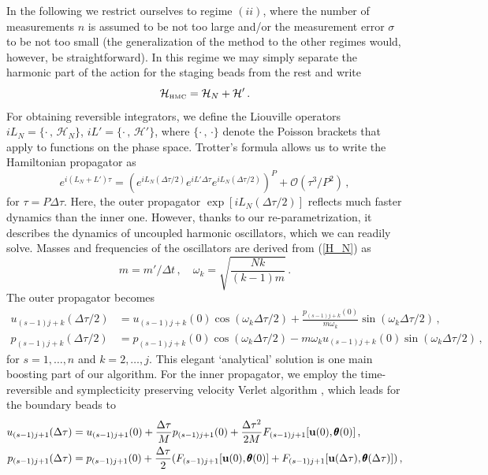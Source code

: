 \documentclass[11pt]{article}
\newcommand{\vc}[1]{{\bf #1 }}
\theoremstyle{definition}
\begin{document}
In the following we restrict ourselves to regime $(ii)$, where the number of measurements $n$ is assumed to be not too large and/or the measurement error $\sigma$ to be not too small (the generalization of the method to the other regimes would, however, be straightforward). In this regime we may simply separate the harmonic part of the action for the staging beads from the rest and write
\begin{equation}
  \mathcal{H}_{\mbox{\tiny HMC}}=\mathcal H_N + \mathcal H'\,.
\end{equation}
For obtaining reversible integrators, we define the Liouville operators
$ iL_N=\{\cdot\,,\,\mathcal H_N\}$, $iL'=\{\cdot\,,\,\mathcal H'\}$,
where $\{\cdot\,,\,\cdot\}$ denote the Poisson brackets that apply to functions on the phase space.
Trotter's formula \cite{trotter_1959} allows us to write the Hamiltonian propagator as
\begin{equation}\label{propagator}
  e^{i(L_N+L')\tau}
  =
  (e^{iL_N(\Delta\tau/2)}e^{iL'\Delta\tau}e^{iL_N(\Delta\tau/2)})^P
  +
  \mathcal O(\tau^3/P^{2})\,,
\end{equation}
for $\tau =P\Delta \tau$.
Here, the outer propagator $\exp[iL_N(\Delta \tau/2)]$ reflects much faster dynamics than the inner one. 
However, thanks to our re-parametrization, it describes the dynamics of uncoupled harmonic oscillators, which we can readily solve.
Masses and frequencies of the oscillators are derived from (\ref{H_N}) as
\begin{equation}
  m=m'/\Delta t\,,\quad
  \omega_k=\sqrt{\frac{Nk}{(k-1)m}}\,.
\end{equation}
The outer propagator becomes
\begin{align}
  u_{(s-1)j+k}(\Delta\tau/2)
  &=
  u_{(s-1)j+k}(0)\cos(\omega_k\Delta\tau/2)
  +
  \frac{p_{(s-1)j+k}(0)}{m\omega_k}\sin(\omega_k\Delta\tau/2)\,,
  \\
  p_{(s-1)j+k}(\Delta\tau/2)
  &=
  p_{(s-1)j+k}(0)\cos(\omega_k\Delta\tau/2)
  -
  m\omega_k u_{(s-1)j+k}(0) \sin(\omega_k\Delta\tau/2)\,,
\end{align}
for $s=1,\dots,n$ and $k=2,\dots,j$. 
This elegant `analytical' solution is one main boosting part of our algorithm. 
For the inner propagator, we employ the time-reversible and symplecticity preserving velocity Verlet algorithm \cite{swope_1982_verlet}, which leads for the boundary beads to
\begin{align}
  u_{(s-1)j+1}(\Delta\tau)
  &= u_{(s-1)j+1}(0)
  +
  \frac{\Delta\tau}{M} p_{(s-1)j+1}(0)
  +
  \frac{\Delta \tau^2}{2M}
  F_{(s-1)j+1}[\vc u(0),{\pmb\theta}(0)]\,,\\
  p_{(s-1)j+1}(\Delta\tau)
  &= p_{(s-1)j+1}(0)
  +
  \frac{\Delta\tau}{2}
  (
  F_{(s-1)j+1}[\vc u(0),{\pmb\theta}(0)]
  +
  F_{(s-1)j+1}[\vc u(\Delta\tau),{\pmb\theta}(\Delta\tau)]
  )\,,
\end{align}
\end{document}
